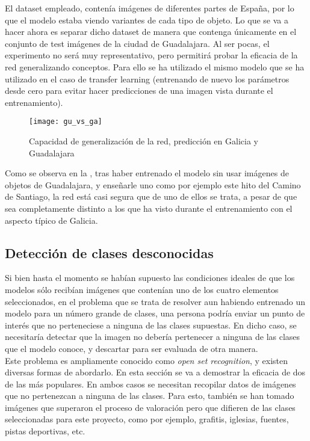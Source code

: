 				El dataset empleado, contenía imágenes de diferentes partes de España, por lo que el modelo estaba viendo variantes de cada tipo de objeto. Lo que se va a hacer ahora es separar dicho dataset de manera que contenga únicamente en el conjunto de test imágenes de la ciudad de Guadalajara. Al ser pocas, el experimento no será muy representativo, pero permitirá probar la eficacia de la red generalizando conceptos. Para ello se ha utilizado el mismo modelo que se ha utilizado en el caso de transfer learning (entrenando de nuevo los parámetros desde cero para evitar hacer predicciones de una imagen vista durante el entrenamiento). \\
				
				\begin{figure}[H]
					\centering
					\texttt{[image: gu\_vs\_ga]}
					\caption{Capacidad de generalización de la red, predicción en Galicia y Guadalajara}
					\label{fig:comparativa_gu}
				\end{figure}
				
				Como se observa en la , tras haber entrenado el modelo sin usar imágenes de objetos de Guadalajara, y enseñarle uno como por ejemplo este hito del Camino de Santiago, la red está casi segura que de uno de ellos se trata, a pesar de que sea completamente distinto a los que ha visto durante el entrenamiento con el aspecto típico de Galicia. 
				
			\subsection{Detección de clases desconocidas}
			
				Si bien hasta el momento se habían supuesto las condiciones ideales de que los modelos sólo recibían imágenes que contenían uno de los cuatro elementos seleccionados, en el problema que se trata de resolver aun habiendo entrenado un modelo para un número grande de clases, una persona podría enviar un punto de interés que no perteneciese a ninguna de las clases supuestas. En dicho caso, se necesitaría detectar que la imagen no debería pertenecer a ninguna de las clases que el modelo conoce, y descartar para ser evaluada de otra manera. \\
				
				Este problema es ampliamente conocido como \textit{open set recognition}, y existen diversas formas de abordarlo. En esta sección se va a demostrar la eficacia de dos de las más populares. En ambos casos se necesitan recopilar datos de imágenes que no pertenezcan a ninguna de las clases. Para esto, también se han tomado imágenes que superaron el proceso de valoración pero que difieren de las clases seleccionadas para este proyecto, como por ejemplo, grafitis, iglesias, fuentes, pistas deportivas, etc. \\
				
